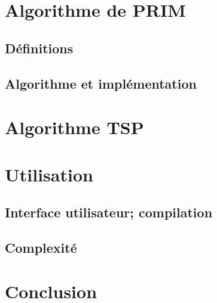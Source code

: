\documentclass{article}
\begin{document}
\section{Algorithme de PRIM}

\subsection{Définitions}


\subsection{Algorithme et implémentation}

\section{Algorithme TSP}

\section{Utilisation}

\subsection{Interface utilisateur; compilation}

\subsection{Complexité}

\section*{Conclusion}
\end{document}
